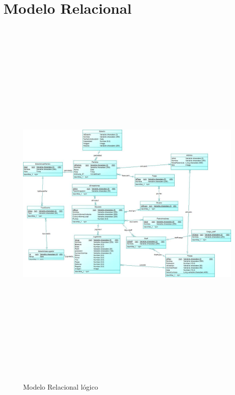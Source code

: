 \section{Modelo Relacional}

\begin{figure}[H]
	\centering
	\includegraphics[width=15cm, height=19cm]{Designe/imgs/model2}
	\caption{Modelo Relacional lógico}
	\label{fig:ModelRel}
\end{figure}

